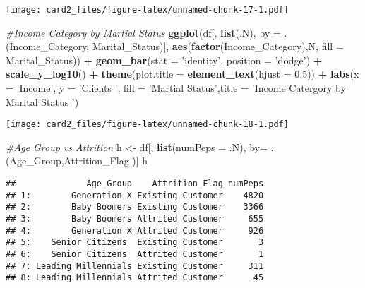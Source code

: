 \documentclass[]{article}
\newenvironment{Shaded}{\begin{snugshade}}{\end{snugshade}}
\newcommand{\CommentTok}[1]{\textcolor[rgb]{0.56,0.35,0.01}{\textit{#1}}}
\newcommand{\DataTypeTok}[1]{\textcolor[rgb]{0.13,0.29,0.53}{#1}}
\newcommand{\FloatTok}[1]{\textcolor[rgb]{0.00,0.00,0.81}{#1}}
\newcommand{\KeywordTok}[1]{\textcolor[rgb]{0.13,0.29,0.53}{\textbf{#1}}}
\newcommand{\NormalTok}[1]{#1}
\newcommand{\OperatorTok}[1]{\textcolor[rgb]{0.81,0.36,0.00}{\textbf{#1}}}
\newcommand{\StringTok}[1]{\textcolor[rgb]{0.31,0.60,0.02}{#1}}
\begin{document}
\texttt{[image: card2\_files/figure-latex/unnamed-chunk-17-1.pdf]}

\begin{Shaded}
\begin{Highlighting}[]
\CommentTok{#Income Category by Martial Status}
\KeywordTok{ggplot}\NormalTok{(df[, }\KeywordTok{list}\NormalTok{(.N), }\DataTypeTok{by =}\NormalTok{ .(Income_Category, Marital_Status)], }\KeywordTok{aes}\NormalTok{(}\KeywordTok{factor}\NormalTok{(Income_Category),N, }\DataTypeTok{fill =}\NormalTok{ Marital_Status)) }\OperatorTok{+}
\StringTok{  }\KeywordTok{geom_bar}\NormalTok{(}\DataTypeTok{stat =} \StringTok{'identity'}\NormalTok{, }\DataTypeTok{position =} \StringTok{'dodge'}\NormalTok{) }\OperatorTok{+}\StringTok{ }\KeywordTok{scale_y_log10}\NormalTok{() }\OperatorTok{+}\StringTok{ }\KeywordTok{theme}\NormalTok{(}\DataTypeTok{plot.title =} \KeywordTok{element_text}\NormalTok{(}\DataTypeTok{hjust =} \FloatTok{0.5}\NormalTok{)) }\OperatorTok{+}\StringTok{ }
\StringTok{  }\KeywordTok{labs}\NormalTok{(}\DataTypeTok{x =} \StringTok{'Income'}\NormalTok{, }\DataTypeTok{y =} \StringTok{'Clients '}\NormalTok{, }\DataTypeTok{fill =} \StringTok{'Martial Status'}\NormalTok{,}\DataTypeTok{title =} \StringTok{'Income Catergory by Marital Status '}\NormalTok{)}
\end{Highlighting}
\end{Shaded}

\texttt{[image: card2\_files/figure-latex/unnamed-chunk-18-1.pdf]}

\begin{Shaded}
\begin{Highlighting}[]
\CommentTok{#Age Group vs Attrition }
\NormalTok{h <-}\StringTok{ }\NormalTok{df[, }\KeywordTok{list}\NormalTok{(}\DataTypeTok{numPeps =}\NormalTok{ .N), by=}\StringTok{ }\NormalTok{.(Age_Group,Attrition_Flag )]}
\NormalTok{h}
\end{Highlighting}
\end{Shaded}

\begin{verbatim}
##              Age_Group    Attrition_Flag numPeps
## 1:        Generation X Existing Customer    4820
## 2:        Baby Boomers Existing Customer    3366
## 3:        Baby Boomers Attrited Customer     655
## 4:        Generation X Attrited Customer     926
## 5:    Senior Citizens  Existing Customer       3
## 6:    Senior Citizens  Attrited Customer       1
## 7: Leading Millennials Existing Customer     311
## 8: Leading Millennials Attrited Customer      45
\end{verbatim}
\end{document}
